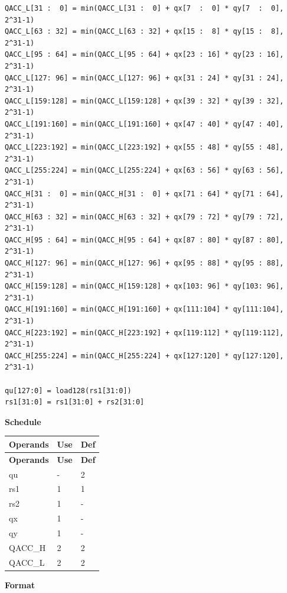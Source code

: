 \begin{lstlisting}
QACC_L[31 :  0] = min(QACC_L[31 :  0] + qx[7  :  0] * qy[7  :  0], 2^31-1)
QACC_L[63 : 32] = min(QACC_L[63 : 32] + qx[15 :  8] * qy[15 :  8], 2^31-1)
QACC_L[95 : 64] = min(QACC_L[95 : 64] + qx[23 : 16] * qy[23 : 16], 2^31-1)
QACC_L[127: 96] = min(QACC_L[127: 96] + qx[31 : 24] * qy[31 : 24], 2^31-1)
QACC_L[159:128] = min(QACC_L[159:128] + qx[39 : 32] * qy[39 : 32], 2^31-1)
QACC_L[191:160] = min(QACC_L[191:160] + qx[47 : 40] * qy[47 : 40], 2^31-1)
QACC_L[223:192] = min(QACC_L[223:192] + qx[55 : 48] * qy[55 : 48], 2^31-1)
QACC_L[255:224] = min(QACC_L[255:224] + qx[63 : 56] * qy[63 : 56], 2^31-1)
QACC_H[31 :  0] = min(QACC_H[31 :  0] + qx[71 : 64] * qy[71 : 64], 2^31-1)
QACC_H[63 : 32] = min(QACC_H[63 : 32] + qx[79 : 72] * qy[79 : 72], 2^31-1)
QACC_H[95 : 64] = min(QACC_H[95 : 64] + qx[87 : 80] * qy[87 : 80], 2^31-1)
QACC_H[127: 96] = min(QACC_H[127: 96] + qx[95 : 88] * qy[95 : 88], 2^31-1)
QACC_H[159:128] = min(QACC_H[159:128] + qx[103: 96] * qy[103: 96], 2^31-1)
QACC_H[191:160] = min(QACC_H[191:160] + qx[111:104] * qy[111:104], 2^31-1)
QACC_H[223:192] = min(QACC_H[223:192] + qx[119:112] * qy[119:112], 2^31-1)
QACC_H[255:224] = min(QACC_H[255:224] + qx[127:120] * qy[127:120], 2^31-1)

qu[127:0] = load128(rs1[31:0])
rs1[31:0] = rs1[31:0] + rs2[31:0]
\end{lstlisting}

\textbf{Schedule}\\
\begin{longtable}[c]{|l|l|l|}
    \hline
    \rowcolor{lightgray}
    \textbf{Operands} & \textbf{Use} & \textbf{Def} \\\hline
    \endfirsthead
    \hline
    \rowcolor{lightgray}
     \textbf{Operands} & \textbf{Use} & \textbf{Def} \\\hline
    \endhead
    \hline
    \endfoot

    qu & - & 2 \\\hline
    rs1 & 1 & 1 \\\hline
    rs2 & 1 & - \\\hline
     qx & 1 & - \\\hline
     qy & 1 & - \\\hline
     QACC\_H & 2 & 2 \\\hline
     QACC\_L & 2 & 2

\end{longtable}

\textbf{Format}\\

